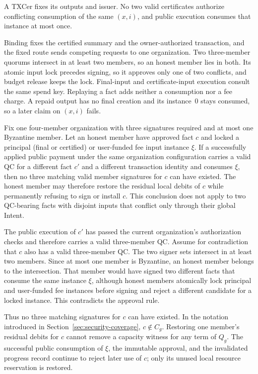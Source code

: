 \begin{lemma}
\label{lem:security-consumption}
A TXCer fixes its outputs and issuer. No two valid certificates
authorize conflicting consumption of the same $(x,i)$, and public
execution consumes that instance at most once.
\end{lemma}
\begin{IEEEproof}
Binding fixes the certified summary and the owner-authorized transaction, and the fixed route sends competing requests to one organization. Two three-member quorums intersect in at least two members, so an honest member lies in both. Its atomic input lock precedes signing, so it approves only one of two conflicts, and budget release keeps the lock. Final-input and certificate-input execution consult the same spend key. Replaying a fact adds neither a consumption nor a fee charge. A repaid output has no final creation and its instance~0 stays consumed, so a later claim on $(x,i)$ fails.
\end{IEEEproof}

\begin{lemma}
\label{lem:security-superseded}
Fix one four-member organization with three signatures required and at
most one Byzantine member.  Let an honest member have approved fact
$c$ and locked a principal (final or certified) or user-funded fee input instance $\xi$.
If a successfully applied public payment under the same organization
configuration carries a valid QC for a different fact $c'$ and a different
transaction identity and consumes $\xi$, then no three matching valid
member signatures for $c$ can have existed. The honest member may therefore
restore the residual local debits of $c$ while permanently refusing to
sign or install $c$.  This conclusion does not apply to two
QC-bearing facts with disjoint inputs that conflict only through their
global Intent.
\end{lemma}

\begin{IEEEproof}
The public execution of $c'$ has passed the current organization's
authorization checks and therefore carries a valid three-member QC.
Assume for contradiction that $c$ also has a valid three-member QC.
The two signer sets intersect in at least two members.  Since at most
one member is Byzantine, an honest member belongs to the intersection.
That member would have signed two different facts that consume the
same instance $\xi$, although honest members atomically lock principal
and user-funded fee instances before signing and reject a different
candidate for a locked instance.  This contradicts the approval rule.

Thus no three matching signatures for $c$ can have existed. In the
notation introduced in Section~\ref{sec:security-coverage}, $c\notin C_g$.
Restoring one member's residual debits for $c$ cannot remove
a capacity witness for any term of $Q_g$.  The successful public
consumption of $\xi$, the immutable approval, and the invalidated
progress record continue to reject later use of $c$; only its unused
local resource reservation is restored.
\end{IEEEproof}

